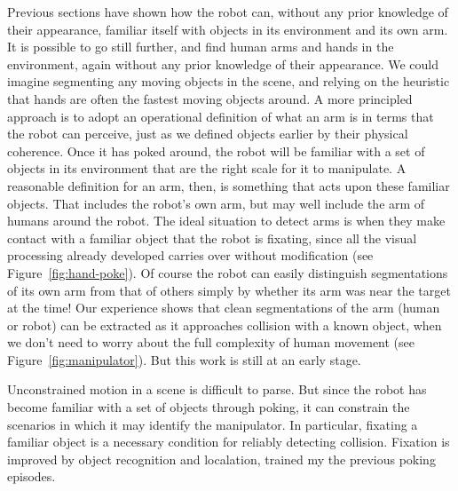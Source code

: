 Previous sections have shown how the robot can, without any prior
knowledge of their appearance, familiar\ize{} itself with objects in its
environment and its own arm.  It is possible to go still further, and
find human arms and hands in the environment, again without any prior
knowledge of their appearance.  We could imagine segmenting any moving
objects in the scene, and relying on the heuristic that hands are
often the fastest moving objects around.  A more principled approach
is to adopt an operational definition of what an arm is in terms that
the robot can perceive, just as we defined objects earlier by their
physical coherence.  Once it has poked around, the robot will be
familiar with a set of objects in its environment that are the right
scale for it to manipulate.  A reasonable definition for an arm, then,
is something that acts upon these familiar objects.  That includes the
robot's own arm, but may well include the arm of humans around the
robot. The ideal situation to detect arms is when they make contact
with a familiar object that the robot is fixating, since all the
visual processing already developed carries over without modification
(see Figure~\ref{fig:hand-poke}).  Of course the robot can easily
distinguish segmentations of its own arm from that of others simply by
whether its arm was near the target at the time!  Our experience shows
that clean segmentations of the arm (human or robot) can be extracted
as it approaches collision with a known object, when we don't need to
worry about the full complexity of human movement (see
Figure~\ref{fig:manipulator}).  But this work is still at an early stage.


\ifverbose

Unconstrained motion in a scene is difficult to parse.  But since the
robot has become familiar with a set of objects through poking, it can
constrain the scenarios in which it may identify the manipulator.  In
particular, fixating a familiar object is a necessary condition for
reliably detecting collision.  Fixation is improved by object recognition
and local\iz{}ation, trained my the previous poking episodes.

